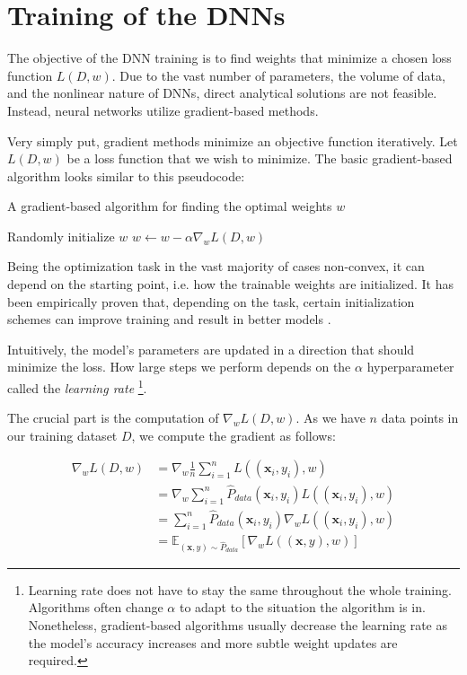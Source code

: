 \section{Training of the DNNs}

The objective of the DNN training is to find weights that minimize a chosen loss function $L(D, w)$. Due to the vast number of parameters, the volume of data, and the nonlinear nature of DNNs, direct analytical solutions are not feasible. Instead, neural networks utilize gradient-based methods.

Very simply put, gradient methods minimize an objective function iteratively. Let $L(D, w)$ be a loss function that we wish to minimize. The basic gradient-based algorithm looks similar to this pseudocode:


\begin{algorithm}[H]
\begin{algorithmic}
	\caption{A gradient-based algorithm for finding the optimal weights $w$}\label{alg:grad}
	\State Randomly initialize $w$
		\State $w \gets w - \alpha \nabla_w L(D, w)$
	\EndWhile
\end{algorithmic}
\end{algorithm}

Being the optimization task in the vast majority of cases non-convex, it can depend on the starting point, i.e. how the trainable weights are initialized. It has been empirically proven that, depending on the task, certain initialization schemes can improve training and result in better models \citep{glorot2010understanding}.

Intuitively, the model’s parameters are updated in a direction that should minimize the loss. How large steps we perform depends on the $\alpha$ hyperparameter called the \emph{learning rate} \footnote{Learning rate does not have to stay the same throughout the whole training. Algorithms often change $\alpha$ to adapt to the situation the algorithm is in. Nonetheless, gradient-based algorithms usually decrease the learning rate as the model's accuracy increases and more subtle weight updates are required.}.

The crucial part is the computation of $\nabla_w L(D, w)$. As we have $n$ data points in our training dataset $D$, we compute the gradient as follows:

\begin{equation}
\begin{aligned}
\nabla_w L(D, w) & = \nabla_w \frac{1}{n} \sum_{i=1}^n L((\textbf{x}_i, y_i), w)\\
 & = \nabla_w \sum_{i=1}^n \hat{P}_{data}(\textbf{x}_i, y_i) L((\textbf{x}_i, y_i), w)\\
 & = \sum_{i=1}^n \hat{P}_{data}(\textbf{x}_i, y_i) \nabla_w L((\textbf{x}_i, y_i), w)\\
 & = \mathbb{E}_{(\textbf{x}, y) \sim \hat{P}_{data}} [ \nabla_w L((\textbf{x}, y), w) ]
\end{aligned}
\end{equation}

